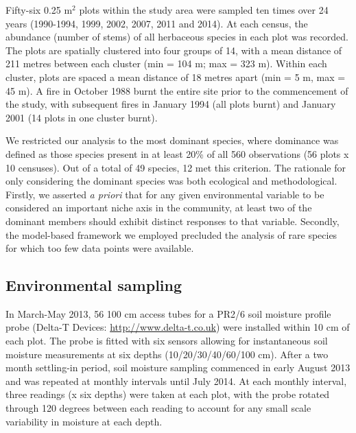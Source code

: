 Fifty-six 0.25 m$^{2}$ plots within the study area were sampled ten times over 24 years (1990-1994, 1999, 2002, 2007, 2011 and 2014). At each census, the abundance (number of stems) of all herbaceous species in each plot was recorded. The plots are spatially clustered into four groups of 14, with a mean distance of 211 metres between each cluster (min = 104 m; max = 323 m). Within each cluster, plots are spaced a mean distance of 18 metres apart (min = 5 m, max = 45 m). A fire in October 1988 burnt the entire site prior to the commencement of the study, with subsequent fires in January 1994 (all plots burnt) and January 2001 (14 plots in one cluster burnt).

We restricted our analysis to the most dominant species, where dominance was defined as those species present in at least 20\% of all 560 observations (56 plots x 10 censuses). Out of a total of 49 species, 12 met this criterion. The rationale for only considering the dominant species was both ecological and methodological. Firstly, we asserted \textit{a priori} that for any given environmental variable to be considered an important niche axis in the community, at least two of the dominant members should exhibit distinct responses to that variable. Secondly, the model-based framework we employed precluded the analysis of rare species for which too few data points were available.      


\subsection{Environmental sampling}

In March-May 2013, 56 100 cm access tubes for a PR2/6 soil moisture profile probe (Delta-T Devices: \url{http://www.delta-t.co.uk}) were installed within 10 cm of each plot. The probe is fitted with six sensors allowing for instantaneous soil moisture measurements at six depths (10/20/30/40/60/100 cm). After a two month settling-in period, soil moisture sampling commenced in early August 2013 and was repeated at monthly intervals until July 2014. At each monthly interval, three readings (x six depths) were taken at each plot, with the probe rotated through 120 degrees between each reading to account for any small scale variability in moisture at each depth.   


